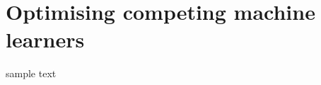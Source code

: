 \documentclass[book.tex]{subfiles}
\begin{document}
\chapter{Optimising competing machine learners}

sample text
\end{document}
